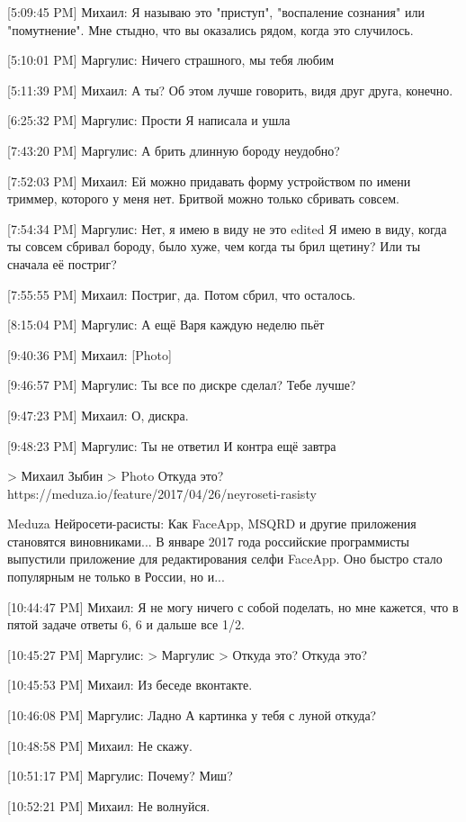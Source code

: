 \documentclass{article}
\begin{document}
[5:09:45 PM] Михаил:
Я называю это "приступ", "воспаление сознания" или "помутнение". Мне стыдно, что вы оказались рядом, когда это случилось.

[5:10:01 PM] Маргулис:
Ничего страшного, мы тебя любим

[5:11:39 PM] Михаил:
А ты?
 Об этом лучше говорить, видя друг друга, конечно.

[6:25:32 PM] Маргулис:
Прости
 Я написала и ушла

[7:43:20 PM] Маргулис:
А брить длинную бороду неудобно?

[7:52:03 PM] Михаил:
Ей можно придавать форму устройством по имени триммер, которого у меня нет. Бритвой можно только сбривать совсем.

[7:54:34 PM] Маргулис:
Нет, я имею в виду не это
edited 
Я имею в виду, когда ты совсем сбривал бороду, было хуже, чем когда ты брил щетину?
 Или ты сначала её постриг?

[7:55:55 PM] Михаил:
Постриг, да. Потом сбрил, что осталось.

[8:15:04 PM] Маргулис:
А ещё Варя каждую неделю пьёт

[9:40:36 PM] Михаил:
[Photo]

[9:46:57 PM] Маргулис:
Ты все по дискре сделал?
 Тебе лучше?

[9:47:23 PM] Михаил:
О, дискра.

[9:48:23 PM] Маргулис:
Ты не ответил
 И контра ещё завтра
 
> Михаил Зыбин
>  Photo
Откуда это?
 https://meduza.io/feature/2017/04/26/neyroseti-rasisty

Meduza
Нейросети-расисты: Как FaceApp, MSQRD и другие приложения становятся виновниками...
В январе 2017 года российские программисты выпустили приложение для редактирования селфи FaceApp. Оно быстро стало популярным не только в России, но и...

[10:44:47 PM] Михаил:
Я не могу ничего с собой поделать, но мне кажется, что в пятой задаче ответы 6, 6 и дальше все 1/2.

[10:45:27 PM] Маргулис:
> Маргулис
> Откуда это?
Откуда это?

[10:45:53 PM] Михаил:
Из беседе вконтакте.

[10:46:08 PM] Маргулис:
Ладно
 А картинка у тебя с луной откуда?

[10:48:58 PM] Михаил:
Не скажу.

[10:51:17 PM] Маргулис:
Почему?
 Миш?

[10:52:21 PM] Михаил:
Не волнуйся.
\end{document}
